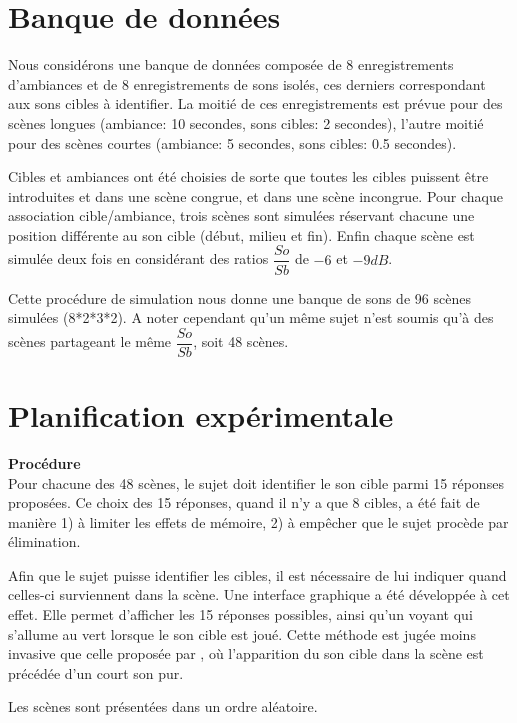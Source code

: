 \section{Banque de données}

Nous considérons une banque de données composée de 8 enregistrements d'ambiances et de 8 enregistrements de sons isolés, ces derniers correspondant aux sons cibles à identifier. La moitié de ces enregistrements est prévue pour des scènes longues (ambiance: 10 secondes, sons cibles: 2 secondes), l'autre moitié pour des scènes courtes (ambiance: 5 secondes, sons cibles: 0.5 secondes).

Cibles et ambiances ont été choisies de sorte que toutes les cibles puissent être introduites et dans une scène congrue, et dans une scène incongrue. Pour chaque association cible/ambiance, trois scènes sont simulées réservant chacune une position différente au son cible (début, milieu et fin). Enfin chaque scène est simulée deux fois en considérant des ratios $\dfrac{So}{Sb}$ de $-6$ et $-9dB$.

Cette procédure de simulation nous donne une banque de sons de 96 scènes simulées (8*2*3*2). A noter cependant qu'un même sujet n'est soumis qu'à des scènes partageant le même $\dfrac{So}{Sb}$, soit 48 scènes.


\section{Planification expérimentale}

{\setlength{\parindent}{0cm}\textbf{Procédure}} \\ 

Pour chacune des 48 scènes, le sujet doit identifier le son cible parmi 15 réponses proposées. Ce choix des 15 réponses, quand il n'y a que 8 cibles, a été fait de manière 1) à limiter les effets de mémoire, 2) à empêcher que le sujet procède par élimination.

Afin que le sujet puisse identifier les cibles, il est nécessaire de lui indiquer quand celles-ci surviennent dans la scène. Une interface graphique a été développée à cet effet. Elle permet d'afficher les 15 réponses possibles, ainsi qu'un voyant qui s'allume au vert lorsque le son cible est joué. Cette méthode est jugée moins invasive que celle proposée par \citep{gygi2011incongruency}, où l’apparition du son cible dans la scène est précédée d'un court son pur.

Les scènes sont présentées dans un ordre aléatoire. \\

